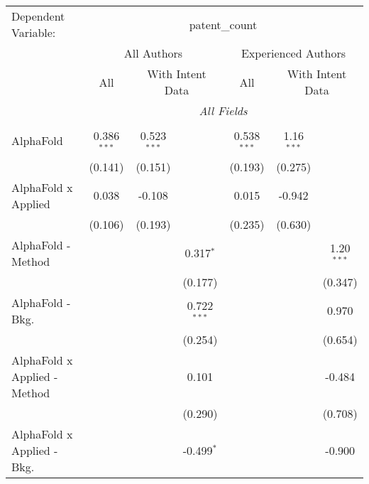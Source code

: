 \begingroup
\centering
\begin{tabular}{lcccccc}
   \tabularnewline \midrule \midrule
   Dependent Variable: & \multicolumn{6}{c}{patent\_count}\\
 & \multicolumn{3}{c}{All Authors} & \multicolumn{3}{c}{Experienced Authors} \\
\cmidrule(lr){2-4} \cmidrule(lr){5-7}
 & \multicolumn{1}{c}{All} & \multicolumn{2}{c}{With Intent Data} & \multicolumn{1}{c}{All} & \multicolumn{2}{c}{With Intent Data} \\
\cmidrule(lr){2-2} \cmidrule(lr){3-4} \cmidrule(lr){5-5} \cmidrule(lr){6-7}
 & \multicolumn{6}{c}{\textit{All Fields}} \\ \\
   AlphaFold                      & 0.386$^{***}$ & 0.523$^{***}$  &                & 0.538$^{***}$ & 1.16$^{***}$ &   \\   
                                  & (0.141)       & (0.151)        &                & (0.193)       & (0.275)      &   \\   
   AlphaFold x Applied            & 0.038         & -0.108         &                & 0.015         & -0.942       &   \\   
                                  & (0.106)       & (0.193)        &                & (0.235)       & (0.630)      &   \\   
   AlphaFold - Method             &               &                & 0.317$^{*}$    &               &              & 1.20$^{***}$\\   
                                  &               &                & (0.177)        &               &              & (0.347)\\   
   AlphaFold - Bkg.               &               &                & 0.722$^{***}$  &               &              & 0.970\\   
                                  &               &                & (0.254)        &               &              & (0.654)\\   
   AlphaFold x Applied - Method   &               &                & 0.101          &               &              & -0.484\\   
                                  &               &                & (0.290)        &               &              & (0.708)\\   
   AlphaFold x Applied - Bkg.     &               &                & -0.499$^{*}$   &               &              & -0.900\\   

\end{tabular}
